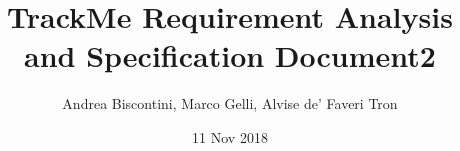 
\usepackage[english]{babel}
\usepackage{natbib}
\usepackage{url}
\usepackage{ulem}

\usepackage[section]{placeins}
\usepackage[dvipsnames]{xcolor}
\usepackage{listings}
\usepackage{alloy-style}

\usepackage{graphicx}
\usepackage{subcaption}
\graphicspath{ {../} }
\UseRawInputEncoding


\title{TrackMe Requirement Analysis and Specification Document}								%
\author{Andrea Biscontini, Marco Gelli, Alvise de' Faveri Tron}								%
\date{11 Nov 2018}											%

\makeatletter
\let\thetitle\@title
\let\theauthor\@author
\let\thedate\@date
\makeatother

\pagestyle{fancy}
\fancyhf{}
\cfoot{\thepage}



\title{2} 


